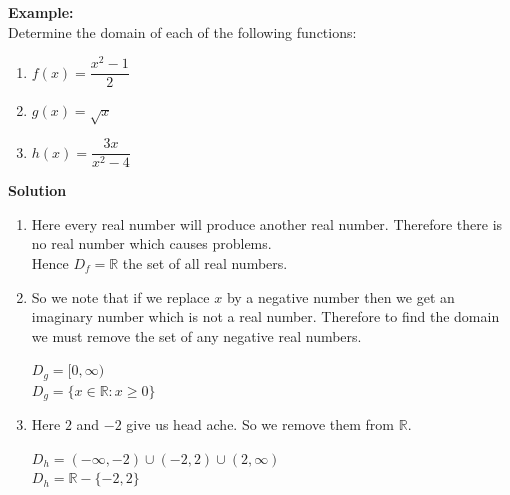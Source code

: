 \documentclass[11pt,a4paper]{article}
\begin{document}
\textbf{Example:}\\
Determine the domain of each of the following functions:
\begin{enumerate}
\item $f(x)=\dfrac{x^2-1}{2}$
\item $g(x)=\sqrt{x}$
\item $h(x)=\dfrac{3x}{x^2-4}$
\end{enumerate}

\textbf{Solution}
\begin{enumerate}
\item Here every real number will produce another real number. Therefore there is no real number which causes problems.\\
Hence $D_f=\mathbb{R}$ the set of all real numbers.
\item So we note that if we replace $x$ by a negative number then we get an imaginary number which is not a real number. Therefore to find the domain we must remove the set of any negative real numbers.\\

\begin{figure}[H]
\centering
{}
\end{figure}

$D_g=[0,\infty)$\\

$D_g=\{x\in \mathbb{R}:x\geq 0\}$

\item Here $2$ and $-2$ give us head ache. So we remove them from $\mathbb{R}$.
\begin{figure}[H]
\centering
{}
\end{figure}

$D_h=(-\infty,-2)\cup (-2,2)\cup (2,\infty)$\\

$D_h=\mathbb{R}-\{-2,2\}$\\
\end{enumerate}
\end{document}
